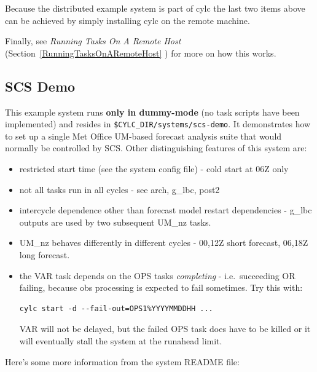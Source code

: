 \documentclass[11pt,a4paper]{article}
\begin{document}
Because the distributed example system is part of cylc the last two
items above can be achieved by simply installing cylc on the remote
machine. 

Finally, see {\em Running Tasks On A Remote Host}
(Section~\ref{RunningTasksOnARemoteHost} ) for more on how this works.

\subsection{SCS Demo}

This example system runs {\bf only in dummy-mode} (no task scripts
have been implemented) and resides in
\lstinline=$CYLC_DIR/systems/scs-demo=.
It demonstrates how to set up a single Met Office
UM-based forecast analysis suite that would normally be controlled by
SCS.  Other distinguishing features of this system are:

\begin{itemize}

    \item restricted start time (see the system config file) - cold start at 06Z only

    \item not all tasks run in all cycles - see arch, g\_lbc, post2

    \item intercycle dependence other than forecast model restart 
        dependencies - g\_lbc outputs are used by two subsequent UM\_nz
        tasks.

    \item UM\_nz behaves differently in different cycles - 00,12Z short
        forecast, 06,18Z long forecast.

    \item the VAR task depends on the OPS tasks {\em completing} - i.e.\
        succeeding OR failing, because obs processing is expected to
        fail sometimes.  Try this with:

        \begin{lstlisting}
cylc start -d --fail-out=OPS1%YYYYMMDDHH ...
        \end{lstlisting}

        VAR will not be delayed, but the failed OPS task does have to be
        killed or it will eventually stall the system at the runahead
        limit.
        
\end{itemize}

Here's some more information from the system README file:
\end{document}
